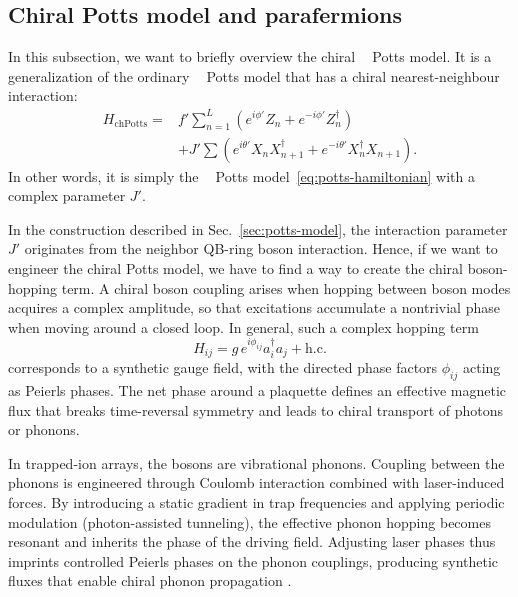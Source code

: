 \documentclass[reprint, aps, prx, amsmath, amssymb, longbibliography, superscriptaddress]{revtex4-2}
\DeclareMathOperator{\Zthree}{\mathbb{Z}_3}
\begin{document}
\subsection{Chiral Potts model and parafermions}


In this subsection, we want to briefly overview the chiral $\Zthree$ Potts model. It is a generalization of the ordinary $\Zthree$ Potts model that has a chiral nearest-neighbour interaction:
\begin{equation}
\label{eq:chiral-potts-hamiltonian}
\begin{aligned}
    H_{\text{chPotts}} = &f'\sum_{n=1}^L (e^{i\phi'} Z_n + e^{-i\phi'} Z_n^{\dagger}) \\
    &+ J' \sum (e^{i\theta'} X_n X_{n+1}^{\dagger} + e^{-i\theta'} X_n^{\dagger} X_{n+1}).
\end{aligned}
\end{equation}
In other words, it is simply the $\Zthree$ Potts model~\eqref{eq:potts-hamiltonian} with a complex parameter $J'$. 

In the construction described in Sec.~\ref{sec:potts-model}, the interaction parameter $J'$ originates from the neighbor QB-ring boson interaction. Hence, if we want to engineer the chiral Potts model, we have to find a way to create the chiral boson-hopping term. A chiral boson coupling arises when hopping between boson modes acquires a complex amplitude, so that excitations accumulate a nontrivial phase when moving around a closed loop. In general, such a complex hopping term
\begin{equation}
H_{ij} = g \, e^{i\phi_{ij}} a_i^\dagger a_j + \mathrm{h.c.}
\end{equation}
corresponds to a synthetic gauge field, with the directed phase factors $\phi_{ij}$ acting as Peierls phases. The net phase around a plaquette defines an effective magnetic flux that breaks time-reversal symmetry and leads to chiral transport of photons or phonons.

In trapped-ion arrays, the bosons are vibrational phonons. Coupling between the phonons is engineered through Coulomb interaction combined with laser-induced forces. By introducing a static gradient in trap frequencies and applying periodic modulation (photon-assisted tunneling), the effective phonon hopping becomes resonant and inherits the phase of the driving field. Adjusting laser phases thus imprints controlled Peierls phases on the phonon couplings, producing synthetic fluxes that enable chiral phonon propagation \cite{bermudez_synthetic_2011, schneider_experimental_2012a,vermersch_implementation_2016,roushan_chiral_2017,kiefer_floquetengineered_2019,bazavan_synthetic_2024}.
\end{document}
